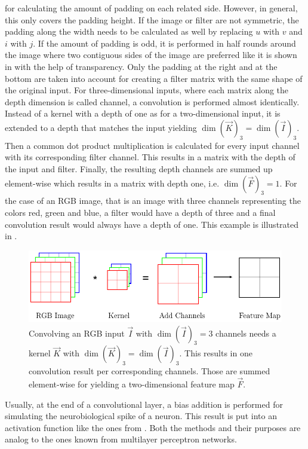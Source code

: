for calculating the amount of padding on each related side.
However, in general, this only covers the padding height.
If the image or filter are not symmetric, the padding along the width needs to be calculated as well by replacing $u$ with $v$ and $i$ with $j$.
If the amount of padding is odd, it is performed in half rounds around the image where two contiguous sides of the image are preferred like it is shown in  with the help of transparency.
Only the padding at the right and at the bottom are taken into account for creating a filter matrix with the same shape of the original input.
For three-dimensional inputs, where each matrix along the depth dimension is called channel, a convolution is performed almost identically.
Instead of a kernel with a depth of one as for a two-dimensional input, it is extended to a depth that matches the input yielding $\dim\left(\vec{K}\right)_3 = \dim\left(\vec{I}\right)_3$.
Then a common dot product multiplication is calculated for every input channel with its corresponding filter channel.
This results in a matrix with the depth of the input and filter.
Finally, the resulting depth channels are summed up element-wise which results in a matrix with depth one, i.e. $\dim\left(\vec{F}\right)_3 = 1$.
For the case of an RGB image, that is an image with three channels representing the colors red, green and blue, a filter would have a depth of three and a final convolution result would always have a depth of one.
This example is illustrated in .
\begin{figure}
	\centering
	\includegraphics{images/convolution_channel.pdf}
	\caption[Convolution of input with multiple channels]{Convolving an RGB input $\vec{I}$ with $\dim(\vec{I})_3=3$ channels needs a kernel $\vec{K}$ with $\dim(\vec{K})_3 = \dim(\vec{I})_3$. This results in one convolution result per corresponding channels. Those are summed element-wise for yielding a two-dimensional feature map $\vec{F}$.}
	\label{fig:convolution-channels}
\end{figure}
Usually, at the end of a convolutional layer, a bias addition is performed for simulating the neurobiological spike of a neuron.
This result is put into an activation function like the ones from .
Both the methods and their purposes are analog to the ones known from multilayer perceptron networks.


